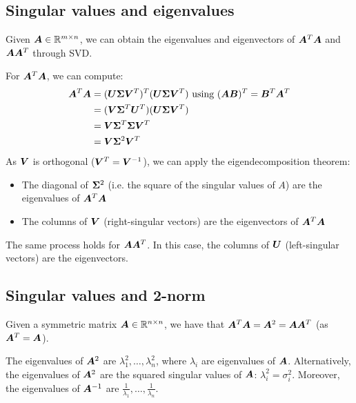 \subsection{Singular values and eigenvalues}
Given ${\bm{A}} \in \mathbb{R}^{m \times n}$, we can obtain the eigenvalues and eigenvectors 
of ${\bm{A}}^T{\bm{A}}$ and ${\bm{A}}{\bm{A}}^T$ through SVD.

For ${\bm{A}}^T{\bm{A}}$, we can compute:
\[
\begin{split}
    {\bm{A}}^T{\bm{A}} & = ({\bm{U}}{\bm{\Sigma}}{\bm{V}}^T)^T({\bm{U}}{\bm{\Sigma}}{\bm{V}}^T) \text{ using } ({\bm{A}}{\bm{B}})^T = {\bm{B}}^T{\bm{A}}^T \\
        & = ({\bm{V}}{\bm{\Sigma}}^T{\bm{U}}^T)({\bm{U}}{\bm{\Sigma}}{\bm{V}}^T) \\
        & = {\bm{V}}{\bm{\Sigma}}^T{\bm{\Sigma}}{\bm{V}}^T \\
        & = {\bm{V}}{\bm{\Sigma}}^2{\bm{V}}^T
\end{split}    
\]
As ${\bm{V}}$ is orthogonal (${\bm{V}}^T = {\bm{V}}^{-1}$), we can apply the eigendecomposition theorem:
\begin{itemize}
    \item The diagonal of ${\bm{\Sigma}}^2$ (i.e. the square of the singular values of $A$) are the eigenvalues of ${\bm{A}}^T{\bm{A}}$
    \item The columns of ${\bm{V}}$ (right-singular vectors) are the eigenvectors of ${\bm{A}}^T{\bm{A}}$
\end{itemize}

The same process holds for ${\bm{A}}{\bm{A}}^T$. In this case, the columns of ${\bm{U}}$ (left-singular vectors) are the eigenvectors.


\subsection{Singular values and 2-norm}
Given a symmetric matrix ${\bm{A}} \in \mathbb{R}^{n \times n}$, 
we have that ${\bm{A}}^T{\bm{A}} = {\bm{A}}^2 = {\bm{A}}{\bm{A}}^T$ (as ${\bm{A}}^T = {\bm{A}}$).

The eigenvalues of ${\bm{A}}^2$ are $\lambda_1^2, \dots,\lambda_n^2$, where $\lambda_i$ are eigenvalues of ${\bm{A}}$.
Alternatively, the eigenvalues of ${\bm{A}}^2$ are the squared singular values of ${\bm{A}}$: $\lambda_i^2 = \sigma_i^2$.
Moreover, the eigenvalues of ${\bm{A}}^{-1}$ are $\frac{1}{\lambda_1}, \dots, \frac{1}{\lambda_n}$.

